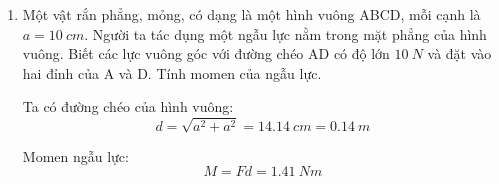 \begin{enumerate}[label=\bfseries Câu \arabic*:, leftmargin=1.5cm]
	\item {}
	
	
	{Một vật rắn phẳng, mỏng, có dạng là một hình vuông ABCD, mỗi cạnh là $a=\SI{10}{cm}$. Người ta tác dụng một ngẫu lực nằm trong mặt phẳng của hình vuông. Biết các lực vuông góc với đường chéo AD có độ lớn $\SI{10}{N}$ và đặt vào hai đỉnh của A và D. Tính momen của ngẫu lực.
	}
	
	\hideall
	{Ta có đường chéo của hình vuông:
		$$d=\sqrt{a^2 + a^2} = \SI{14.14}{cm} = \SI{0.14}{m}$$
		
		Momen ngẫu lực:
		$$M=Fd = \SI{1.41}{Nm}$$
	}
\end{enumerate}